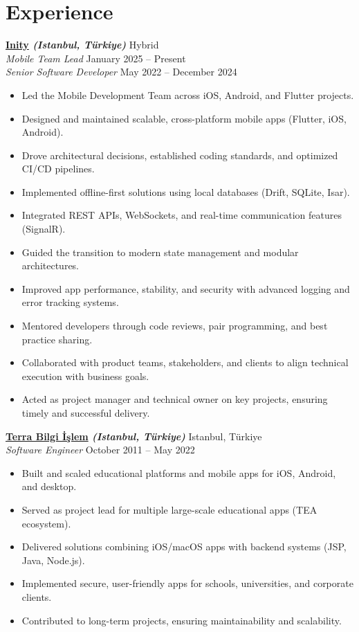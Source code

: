 \documentclass[11pt,a4paper]{extarticle}
\begin{document}
\section{Experience}
\textbf{\href{https://inity.com.tr}{Inity} \textit{(Istanbul, Türkiye)}} \hfill Hybrid\\
\textit{Mobile Team Lead} \hfill January 2025 -- Present\\
\textit{Senior Software Developer} \hfill May 2022 -- December 2024
\begin{itemize}[leftmargin=*,noitemsep,topsep=0pt]
    \item Led the Mobile Development Team across iOS, Android, and Flutter projects.
    \item Designed and maintained scalable, cross-platform mobile apps (Flutter, iOS, Android).
    \item Drove architectural decisions, established coding standards, and optimized CI/CD pipelines.
    \item Implemented offline-first solutions using local databases (Drift, SQLite, Isar).
    \item Integrated REST APIs, WebSockets, and real-time communication features (SignalR).
    \item Guided the transition to modern state management and modular architectures.
    \item Improved app performance, stability, and security with advanced logging and error tracking systems.
    \item Mentored developers through code reviews, pair programming, and best practice sharing.
    \item Collaborated with product teams, stakeholders, and clients to align technical execution with business goals.
    \item Acted as project manager and technical owner on key projects, ensuring timely and successful delivery.
\end{itemize}

\textbf{\href{https://www.terrabilgiisilem}{Terra Bilgi İşlem} \textit{(Istanbul, Türkiye)}} \hfill Istanbul, Türkiye\\
\textit{Software Engineer} \hfill October 2011 -- May 2022
\begin{itemize}[leftmargin=*,noitemsep,topsep=0pt]
    \item Built and scaled educational platforms and mobile apps for iOS, Android, and desktop.
    \item Served as project lead for multiple large-scale educational apps (TEA ecosystem).
    \item Delivered solutions combining iOS/macOS apps with backend systems (JSP, Java, Node.js).
    \item Implemented secure, user-friendly apps for schools, universities, and corporate clients.
    \item Contributed to long-term projects, ensuring maintainability and scalability.
\end{itemize}
\end{document}
